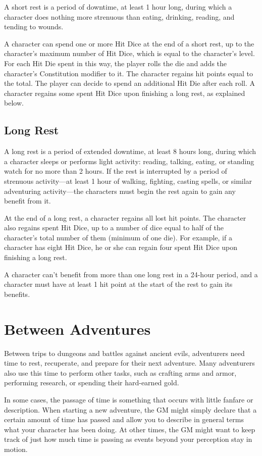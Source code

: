 A short rest is a period of downtime, at least 1 hour long, during which a character does nothing more strenuous than eating, drinking, reading, and tending to wounds.

A character can spend one or more Hit Dice at the end of a short rest, up to the character's maximum number of Hit Dice, which is equal to the character's level. For each Hit Die spent in this way, the player rolls the die and adds the character's Constitution modifier to it. The character regains hit points equal to the total. The player can decide to spend an additional Hit Die after each roll. A character regains some spent Hit Dice upon finishing a long rest, as explained below.

\subsection{Long Rest}

A long rest is a period of extended downtime, at least 8 hours long, during which a character sleeps or performs light activity: reading, talking, eating, or standing watch for no more than 2 hours. If the rest is interrupted by a period of strenuous activity—at least 1 hour of walking, fighting, casting spells, or similar adventuring activity—the characters must begin the rest again to gain any benefit from it.

At the end of a long rest, a character regains all lost hit points. The character also regains spent Hit Dice, up to a number of dice equal to half of the character's total number of them (minimum of one die). For example, if a character has eight Hit Dice, he or she can regain four spent Hit Dice upon finishing a long rest.

A character can't benefit from more than one long rest in a 24-hour period, and a character must have at least 1 hit point at the start of the rest to gain its benefits.

\section{Between Adventures}

Between trips to dungeons and battles against ancient evils, adventurers need time to rest, recuperate, and prepare for their next adventure. Many adventurers also use this time to perform other tasks, such as crafting arms and armor, performing research, or spending their hard-earned gold.

In some cases, the passage of time is something that occurs with little fanfare or description. When starting a new adventure, the GM might simply declare that a certain amount of time has passed and allow you to describe in general terms what your character has been doing. At other times, the GM might want to keep track of just how much time is passing as events beyond your perception stay in motion.

